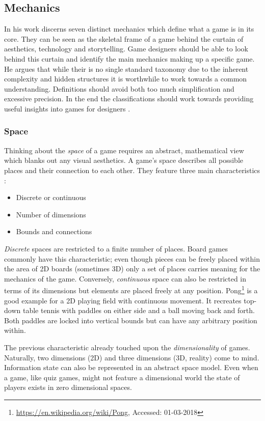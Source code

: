 \subsection{Mechanics} \label{sec:mechanics}
In his work \citeauthor{Schell2014} discerns seven distinct mechanics which define what a game is in its core.
They can be seen as the skeletal frame of a game behind the curtain of aesthetics, technology and storytelling.
Game designers should be able to look behind this curtain and identify the main mechanics making up a specific game.
He argues that while their is no single standard taxonomy due to the inherent complexity and hidden structures it is worthwhile to work towards a common understanding.
Definitions should avoid both too much simplification and excessive precision.
In the end the classifications should work towards providing useful insights into games for designers \cite{Schell2014}.

\subsubsection{Space} \label{sec:space}
Thinking about the \textit{space} of a game requires an abstract, mathematical view which blanks out any visual aesthetics.
A game's space describes all possible places and their connection to each other.
They feature three main characteristics \cite{Schell2014}:
\begin{itemize}
    \item Discrete or continuous
    \item Number of dimensions
    \item Bounds and connections
\end{itemize}
\textit{Discrete} spaces are restricted to a finite number of places.
Board games commonly have this characteristic; even though pieces can be freely placed within the area of 2D boards (sometimes 3D) only a set of places carries meaning for the mechanics of the game.
Conversely, \textit{continuous} space can also be restricted in terms of its dimensions but elements are placed freely at any position.
Pong\footnote{\url{https://en.wikipedia.org/wiki/Pong}, Accessed: 01-03-2018} is a good example for a 2D playing field with continuous movement.
It recreates top-down table tennis with paddles on either side and a ball moving back and forth.
Both paddles are locked into vertical bounds but can have any arbitrary position within.

The previous characteristic already touched upon the \textit{dimensionality} of games.
Naturally, two dimensions (2D) and three dimensions (3D, reality) come to mind.
Information state can also be represented in an abstract space model.
Even when a game, like quiz games, might not feature a dimensional world the state of players exists in zero dimensional spaces.


